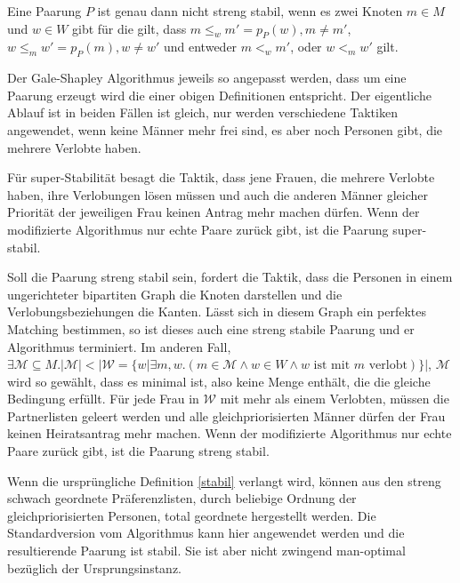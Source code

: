 \begin{Definition}
\label{streng_stabil}
  Eine Paarung $P$ ist genau dann nicht streng stabil, wenn es zwei Knoten $m \in M$ und $w \in W$ gibt für die gilt, dass $m \leq_{w} m' = p_{P}(w), m \neq m'$, $w \leq_{m} w' = p_{P}(m), w \neq w'$ und entweder $m <_{w} m'$, oder $w <_{m} w'$ gilt.
\end{Definition}

Der Gale-Shapley Algorithmus jeweils so angepasst werden, dass um eine Paarung erzeugt wird die einer obigen Definitionen entspricht. Der eigentliche Ablauf ist in beiden Fällen ist gleich, nur werden verschiedene Taktiken angewendet, wenn keine Männer mehr frei sind, es aber noch Personen gibt, die mehrere Verlobte haben.



Für super-Stabilität besagt die Taktik, dass jene Frauen, die mehrere Verlobte haben, ihre Verlobungen lösen müssen und auch die anderen Männer gleicher Priorität der jeweiligen Frau keinen Antrag mehr machen dürfen. Wenn der modifizierte Algorithmus nur echte Paare zurück gibt, ist die Paarung super-stabil.\par
Soll die Paarung streng stabil sein, fordert die Taktik, dass die Personen in einem ungerichteter bipartiten Graph die Knoten darstellen und die Verlobungsbeziehungen die Kanten. Lässt sich in diesem Graph ein perfektes Matching bestimmen, so ist dieses auch eine streng stabile Paarung und er Algorithmus terminiert. Im anderen Fall, $\exists \mathcal{M} \subseteq M. |\mathcal{M}| < |\mathcal{W} = \{w | \exists m, w.(m \in \mathcal{M} \land w \in W \land  w \textrm{ ist mit } m \textrm{ verlobt})\}|$, $\mathcal{M}$ wird so gewählt, dass es minimal ist, also keine Menge enthält, die die gleiche Bedingung erfüllt. Für jede Frau in $\mathcal{W}$ mit mehr als einem Verlobten, müssen die Partnerlisten geleert werden und alle gleichpriorisierten Männer dürfen der Frau keinen Heiratsantrag mehr machen.
Wenn der modifizierte Algorithmus nur echte Paare zurück gibt, ist die Paarung streng stabil.\par
Wenn die ursprüngliche Definition \ref{stabil} verlangt wird, können aus den streng schwach geordnete Präferenzlisten, durch beliebige Ordnung der gleichpriorisierten Personen, total geordnete hergestellt werden. Die Standardversion vom Algorithmus kann hier angewendet werden und die resultierende Paarung ist stabil. Sie ist aber nicht zwingend man-optimal bezüglich der Ursprungsinstanz.
